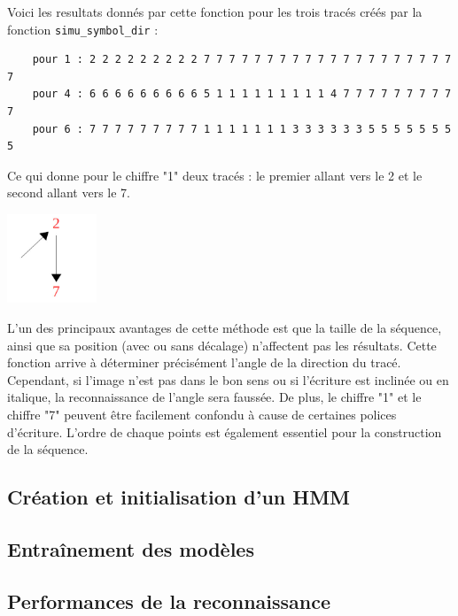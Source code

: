 Voici les resultats donnés par cette fonction pour les trois tracés créés par la fonction \texttt{simu\_symbol\_dir} :
\begin{lstlisting}
	pour 1 : 2 2 2 2 2 2 2 2 2 7 7 7 7 7 7 7 7 7 7 7 7 7 7 7 7 7 7 7 7 7 
	pour 4 : 6 6 6 6 6 6 6 6 6 5 1 1 1 1 1 1 1 1 1 4 7 7 7 7 7 7 7 7 7 7 
	pour 6 : 7 7 7 7 7 7 7 7 7 1 1 1 1 1 1 1 3 3 3 3 3 3 5 5 5 5 5 5 5 5 
\end{lstlisting}
Ce qui donne pour le chiffre "1" deux tracés : le premier allant vers le 2 et le second allant vers le 7.
\begin{center}
	\includegraphics[width=0.20\textwidth]{Figures/direction_results.jpg}
\end{center}

L'un des principaux avantages de cette méthode est que la taille de la séquence, ainsi que sa position (avec ou sans décalage) n'affectent pas les résultats. Cette fonction arrive à déterminer précisément l'angle de la direction du tracé. Cependant, si l'image n'est pas dans le bon sens ou si l'écriture est inclinée ou en italique, la reconnaissance de l'angle sera faussée. De plus, le chiffre "1" et le chiffre "7" peuvent être facilement confondu à cause de certaines polices d'écriture. L'ordre de chaque points est également essentiel pour la construction de la séquence.


\subsection{Création et initialisation d'un HMM}


\subsection{Entraînement des modèles}


\subsection{Performances de la reconnaissance}
